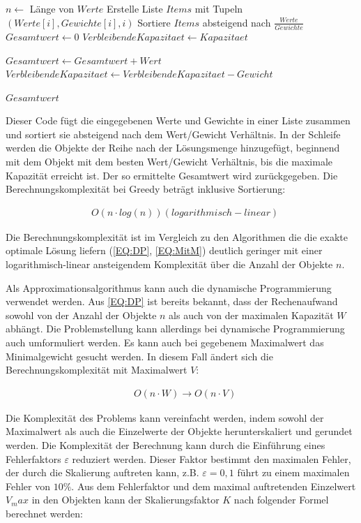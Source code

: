 \begin{algorithmic}
    \State $n \leftarrow$ Länge von $Werte$
    \State Erstelle Liste $Items$ mit Tupeln $(Werte[i], Gewichte[i], i)$
    \State Sortiere $Items$ absteigend nach $\frac{Werte}{Gewichte}$
    \State $Gesamtwert \leftarrow 0$
    \State $VerbleibendeKapazitaet \leftarrow Kapazitaet$

            \State $Gesamtwert \leftarrow Gesamtwert + Wert$
            \State $VerbleibendeKapazitaet \leftarrow VerbleibendeKapazitaet - Gewicht$
        \EndIf
    \EndFor

    \State \Return $Gesamtwert$
    \EndFunction
\end{algorithmic}

Dieser Code fügt die eingegebenen Werte und Gewichte in einer Liste zusammen und sortiert sie absteigend nach dem Wert/Gewicht Verhältnis. In der Schleife werden die Objekte der Reihe nach der Lösungsmenge hinzugefügt, beginnend mit dem Objekt mit dem besten Wert/Gewicht Verhältnis, bis die maximale Kapazität erreicht ist. Der so ermittelte Gesamtwert wird zurückgegeben. Die Berechnungskomplexität bei Greedy beträgt inklusive Sortierung:

\begin{align}
    & O(n \cdot log(n)) (logarithmisch-linear)
\end{align}

Die Berechnungskomplexität ist im Vergleich zu den Algorithmen die die exakte optimale Lösung liefern (\autoref{EQ:DP}, \autoref{EQ:MitM}) deutlich geringer mit einer logarithmisch-linear ansteigendem Komplexität über die Anzahl der Objekte $ n $. 

Als Approximationsalgorithmus kann auch die dynamische Programmierung verwendet werden. Aus \autoref{EQ:DP} ist bereits bekannt, dass der Rechenaufwand sowohl von der Anzahl der Objekte $ n $ als auch von der maximalen Kapazität $ W $ abhängt. Die  Problemstellung kann allerdings bei dynamische Programmierung auch umformuliert werden. Es kann auch bei gegebenem Maximalwert das Minimalgewicht gesucht werden. In diesem Fall ändert sich die Berechnungskomplexität mit Maximalwert $ V $:

\begin{align}
    & O(n \cdot W)  \rightarrow O(n \cdot V) 
\end{align}

Die Komplexität des Problems kann vereinfacht werden, indem sowohl der Maximalwert als auch die Einzelwerte der Objekte herunterskaliert und gerundet werden.  Die Komplexität der Berechnung kann durch die Einführung eines Fehlerfaktors $ \varepsilon $ reduziert werden. Dieser Faktor bestimmt den maximalen Fehler, der durch die Skalierung auftreten kann, z.B. $ \varepsilon = 0,1 $ führt zu einem maximalen Fehler von $ 10 \% $. Aus dem Fehlerfaktor und dem maximal auftretenden Einzelwert $ V_max $ in den Objekten kann der Skalierungsfaktor $ K $ nach folgender Formel berechnet werden:

